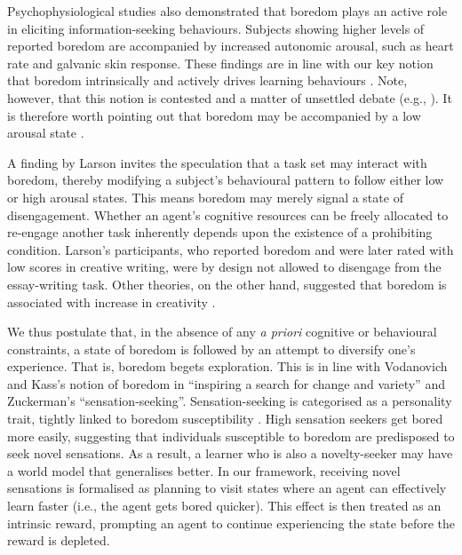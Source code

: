 \documentclass[utf8]{frontiersSCNS}
\begin{document}
\label{rev:arousal}
Psychophysiological studies also demonstrated that boredom plays an active role in eliciting information-seeking behaviours. Subjects showing higher levels of reported boredom are accompanied by increased autonomic arousal, such as heart rate and galvanic skin response. These findings are in line with our key notion that boredom intrinsically and actively drives learning behaviours \citep{berlyne1960conflict, london1972increase, harris2000correlates}. Note, however, that this notion is contested and a matter of unsettled debate (e.g., \citealp{eastwood2012unengaged, fahlman2013development, Merrifield2014, Danckert.2018}). It is therefore worth pointing out that boredom may be accompanied by a low arousal state \citep{barmack1939definition, geiwitz1966structure, pattyn2008psychophysiological, vogel2012definition, mikulas1993essence}.

A finding by Larson \citeyearpar{larson1990emotions} invites the speculation that a task set may interact with boredom, thereby modifying a subject’s behavioural pattern to follow either low or high arousal states. This means boredom may merely signal a state of disengagement. Whether an agent’s cognitive resources can be freely allocated to re-engage another task inherently depends upon the existence of a prohibiting condition. Larson’s \citeyearpar{larson1990emotions} participants, who reported boredom and were later rated with low scores in creative writing, were by design not allowed to disengage from the essay-writing task. Other theories, on the other hand, suggested that boredom is associated with increase in creativity \citep{harris2000correlates, schubert1977boredom, schubert1978creativity}. 

We thus postulate that, in the absence of any {\it a priori} cognitive or behavioural constraints, a state of boredom is followed by an attempt to diversify one’s experience. That is, boredom begets exploration. This is in line with Vodanovich and Kass’s \citeyearpar{vodanovich1990factor} notion of boredom in ``inspiring a search for change and variety'' and Zuckerman’s \citeyearpar{zuckerman2008sensation} ``sensation-seeking''. Sensation-seeking \citep{zuckerman1971dimensions, zuckerman2008sensation, dahlen2005driving, kass1990boredom} is categorised as a personality trait, tightly linked to boredom susceptibility \citep{zuckerman1978sensation}. High sensation seekers get bored more easily, suggesting that individuals susceptible to boredom are predisposed to seek novel sensations. As a result, a learner who is also a novelty-seeker may have a world model that generalises better. In our framework, receiving novel sensations is formalised as planning to visit states where an agent can effectively learn faster (i.e., the agent gets bored quicker). This effect is then treated as an intrinsic reward, prompting an agent to continue experiencing the state before the reward is depleted. 
\end{document}
